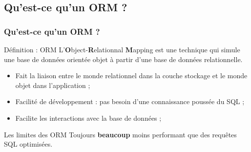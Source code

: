 	\subsection{Qu'est-ce qu'un ORM ?}
	\begin{frame}
		\frametitle{Qu'est-ce qu'un ORM ?}

		\begin{block}{Définition : ORM}
			L'\textbf{O}bject-\textbf{R}elationnal \textbf{M}apping est une technique qui simule une base de données orientée objet à partir d'une base de données relationnelle.
		\end{block}

		\vspace{5px}

		\begin{itemize}
			\item Fait la liaison entre le monde relationnel dans la couche stockage et le monde objet dans l'application ;
			\item Facilité de développement : pas besoin d'une connaissance poussée du SQL ;
			\item Facilite les interactions avec la base de données ;
		\end{itemize}

		\vspace{5px}

		\begin{alertblock}{Les limites des ORM}
			Toujours \textbf{beaucoup} moins performant que des requêtes SQL optimisées.
		\end{alertblock}

	\end{frame}